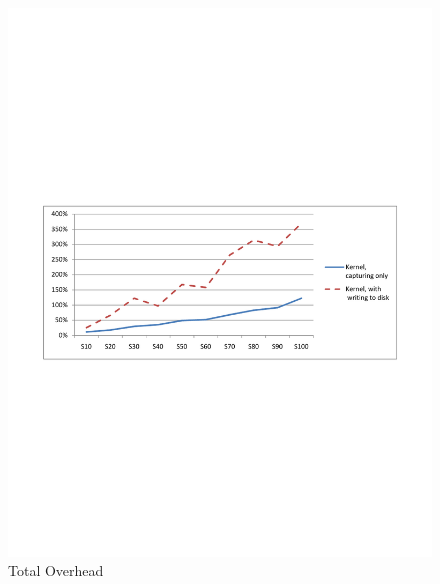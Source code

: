 \begin{figure}[h] 
\begin{centering} 
\includegraphics[scale=0.6, clip=true, viewport=1cm 10cm 20cm 19cm]{images/diagrams/Performance_TotalOverhead.pdf} 
\caption{Total Overhead} 
\label{Performance_TotalOverhead} 
\end{centering} 
\end{figure}


